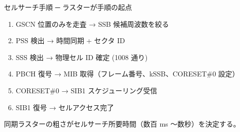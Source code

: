 \begin{frame}{セルサーチ手順 ─ ラスターが手順の起点}
\begin{enumerate}
  \item GSCN 位置のみを走査 → SSB 候補周波数を絞る
  \item PSS 検出 → 時間同期 + セクタ ID
  \item SSS 検出 → 物理セル ID 確定 (1008 通り)
  \item PBCH 復号 → MIB 取得（フレーム番号、kSSB、CORESET\#0 設定）
  \item CORESET\#0 → SIB1 スケジューリング受信
  \item SIB1 復号 → セルアクセス完了
\end{enumerate}

\vspace{0.4em}
{\small 同期ラスターの粗さがセルサーチ所要時間（数百 ms 〜数秒）を決定する。}
\end{frame}
